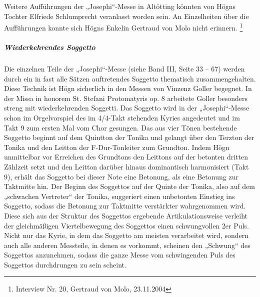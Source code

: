 Weitere Aufführungen der „Josephi“-Messe in Altötting könnten von Högns
Tochter Elfriede Schlumprecht veranlasst worden sein. An Einzelheiten
über die Aufführungen konnte sich Högns Enkelin Gertraud von Molo nicht
erinnern. \footnote{Interview Nr. 20, Gertraud von Molo, 23.11.2004}

\clearpage\subparagraph{Wiederkehrendes Soggetto}
Die einzelnen Teile der „Josephi“-Messe (siehe Band III, Seite 33 – 67)
werden durch ein in fast alle Sätzen auftretendes Soggetto thematisch
zusammengehalten. Diese Technik ist Högn sicherlich in den Messen von
Vinzenz Goller begegnet. In der Missa in honorem St. Stefani
Protomatyris op. 8 arbeitete Goller besonders streng mit
wiederkehrenden Soggetti. Das Soggetto wird in der „Josephi“-Messe
schon im Orgelvorspiel des im 4/4-Takt stehenden Kyries angedeutet und
im Takt 9 zum ersten Mal vom Chor gesungen. Das aus vier Tönen
bestehende Soggetto beginnt auf dem Quintton der Tonika und gelangt
über den Terzton der Tonika und den Leitton der F-Dur-Tonleiter zum
Grundton. Indem Högn unmittelbar vor Erreichen des Grundtons den
Leittons auf der betonten dritten Zählzeit setzt und den Leitton
darüber hinaus dominantisch harmonisiert (Takt 9), erhält das Soggetto
bei dieser Note eine Betonung, als eine Betonung zur Taktmitte hin. Der
Beginn des Soggettos auf der Quinte der Tonika, also auf dem „schwachen
Vertreter“ der Tonika, suggeriert einen unbetonten Einstieg ins
Soggetto, sodass die Betonung zur Taktmitte verstärkter wahrgenommen
wird. Diese sich aus der Struktur des Soggettos ergebende
Artikulationsweise verleiht der gleichmäßigen Viertelbewegung des
Soggettos einen schwungvollen 2er Puls. Nicht nur das Kyrie, in dem das
Soggetto am meisten verarbeitet wird, sondern auch alle anderen
Messteile, in denen es vorkommt, scheinen den „Schwung“ des Soggettos
anzunehmen, sodass die ganze Messe vom schwingenden Puls des Soggettos
durchdrungen zu sein scheint.

